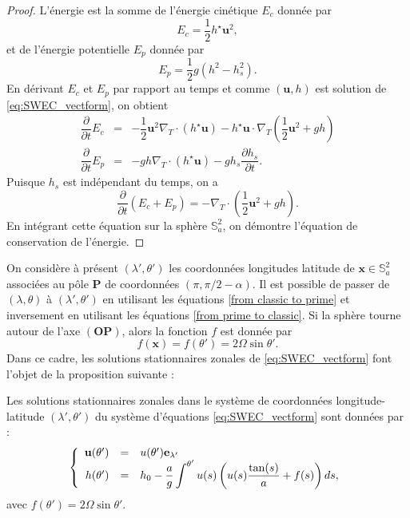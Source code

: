 \begin{proof}
L'énergie est la somme de l'énergie cinétique $E_c$ donnée par
\begin{equation}
E_c = \dfrac{1}{2} h^{\star} \mathbf{u}^2,
\end{equation}
et de l'énergie potentielle $E_p$ donnée par
\begin{equation}
E_p = \dfrac{1}{2} g (h^2 - h_s^2).
\end{equation}
En dérivant $E_c$ et $E_p$ par rapport au temps et comme $(\mathbf{u},h)$ est solution de \eqref{eq:SWEC_vectform}, on obtient
\begin{equation}
\begin{array}{rcl}
\dfrac{\partial}{\partial t} E_c & = & -\dfrac{1}{2} \mathbf{u}^2 \nabla_T \cdot \left( h^{\star} \mathbf{u} \right) - h^{\star} \mathbf{u} \cdot \nabla_T \left( \dfrac{1}{2} \mathbf{u}^2 + gh \right) \\
\dfrac{\partial}{\partial t} E_p & = & - gh \nabla_T \cdot \left( h^{\star} \mathbf{u} \right) - g h_s \dfrac{\partial h_s}{\partial t}.
\end{array}
\end{equation}
Puisque $h_s$ est indépendant du temps, on a
\begin{equation}
\dfrac{\partial}{\partial t} \left( E_c + E_p \right) = - \nabla_T \cdot \left( \dfrac{1}{2} \mathbf{u}^2 + gh \right).
\end{equation}
En intégrant cette équation sur la sphère $\mathbb{S}_a^2$, on démontre l'équation de conservation de l'énergie.
\end{proof}

On considère à présent $(\lambda',\theta')$ les coordonnées longitudes latitude de $\mathbf{x} \in \mathbb{S}_a^2$ associées au pôle $\mathbf{P}$ de coordonnées $(\pi, \pi/2-\alpha)$. Il est possible de passer de $(\lambda, \theta)$ à $(\lambda',\theta')$ en utilisant les équations \eqref{from classic to prime} et inversement en utilisant les équations \eqref{from prime to classic}. Si la sphère tourne autour de l'axe $(\mathbf{O}\mathbf{P})$, alors la fonction $f$ est donnée par
\begin{equation}
f(\mathbf{x}) = f(\theta') = 2 \Omega \sin \theta'.
\end{equation}
Dans ce cadre, les solutions stationnaires zonales de \eqref{eq:SWEC_vectform} font l'objet de la proposition suivante :
\begin{proposition}
\label{prop:swe_zonalestat}
Les solutions stationnaires zonales dans le système de coordonnées longitude-latitude $(\lambda', \theta')$ du système d'équations \eqref{eq:SWEC_vectform} sont données par :
\begin{equation}
\left\lbrace
\begin{array}{rcl}
\mathbf{u}(\theta') & = & u(\theta') \mathbf{e}_{\lambda'} \\
h(\theta') & = & h_0 - \dfrac{a}{g} \displaystyle\int^{\theta'} u(s) \left( u(s) \dfrac{\tan(s)}{a} + f(s)  \right)ds,
\end{array}
\right.
\end{equation}
avec $f(\theta') = 2 \Omega \sin \theta'$.
\end{proposition}

